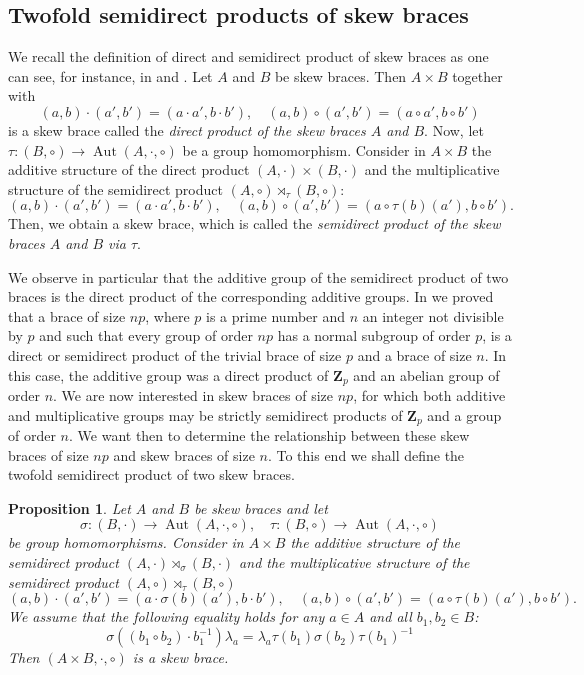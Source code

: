 \documentclass[12pt]{article}
\newtheorem{proposition}[theorem]{Proposition}
\theoremstyle{definition}
\newcommand{\Z}{\mathbf Z}
\newcommand{\Aut}{\operatorname{Aut}}
\begin{document}
\subsection{Twofold semidirect products of skew braces}
	
	We recall the definition of direct and semidirect product of skew braces as one can see, for instance, in \cite{Cedo} and \cite{SV}. Let $A$ and $B$ be skew braces. Then $A \times B$ together with
	$$
	(a,b)\cdot(a',b')=(a\cdot a',b\cdot b'),\quad (a,b)\circ (a',b')=(a\circ a',b\circ b')
	$$
	is a skew brace called the \textit{direct product of the skew braces $A$ and $B$}. Now, let $\tau:(B,\circ)\to\Aut(A,\cdot,\circ)$
	be a group homomorphism.
	Consider in $A\times B$
	the additive structure of the direct product $(A,\cdot)\times (B,\cdot)$ and the multiplicative structure of the semidirect product $(A,\circ)\rtimes_{\tau} (B,\circ)$:
	$$
	(a,b)\cdot(a',b')=(a\cdot a',b\cdot b'),\quad 
	(a,b)\circ(a',b')=(a\circ\tau(b)(a'),b\circ b').
	$$
	Then, we obtain a skew brace,  which is called the \textit{semidirect product of the skew braces $A$ and $B$ via $\tau$}.
    

	
	We observe in particular that the additive group of the semidirect product of two braces is the direct product of the corresponding additive groups. In \cite{CGRV2} we proved that a brace of size $np$, where $p$ is a prime number and $n$ an integer not divisible by $p$ and such that every group of order $np$ has a normal subgroup of order $p$, is a direct or semidirect product of the trivial brace of size $p$ and a brace of size $n$. In this case, the additive group was a direct product of $\Z_p$ and an abelian group of order $n$. We are now interested in skew braces of size $np$, for which both additive and multiplicative groups may be strictly semidirect products of $\Z_p$ and a group of order $n$. We want then to determine the relationship between these skew braces of size $np$ and skew braces of size $n$. To this end we shall define the twofold semidirect product of two skew braces.
	
	\begin{proposition}\label{dsdp}
		Let $A$ and $B$ be skew braces and let
		$$\sigma:(B,\cdot)\to\Aut(A,\cdot,\circ), \quad \tau:(B,\circ)\to\Aut(A,\cdot,\circ)$$
		be group homomorphisms. Consider in $A\times B$
		the additive structure of the semidirect product 
        $(A,\cdot)\rtimes_{\sigma} (B,\cdot)$
        and the multiplicative structure of the semidirect product
        $(A,\circ)\rtimes_{\tau} (B,\circ)$
		$$
		(a,b)\cdot(a',b')=(a\cdot\sigma(b)(a'),b\cdot b'),\quad 
		(a,b)\circ(a',b')=(a\circ\tau(b)(a'),b\circ b').
		$$
		We assume that the following equality holds for any $a\in A$ and all $b_1, b_2 \in B$:
		\begin{equation}\label{eqdsdp}
		\sigma((b_1\circ b_2)\cdot b_1^{-1})\lambda_a=\lambda_a\tau(b_1) \sigma(b_2) \tau(b_1)^{-1}
		\end{equation} 
		Then $(A\times B, \cdot,\circ)$ is a skew brace.
	\end{proposition}
	
\end{document}
